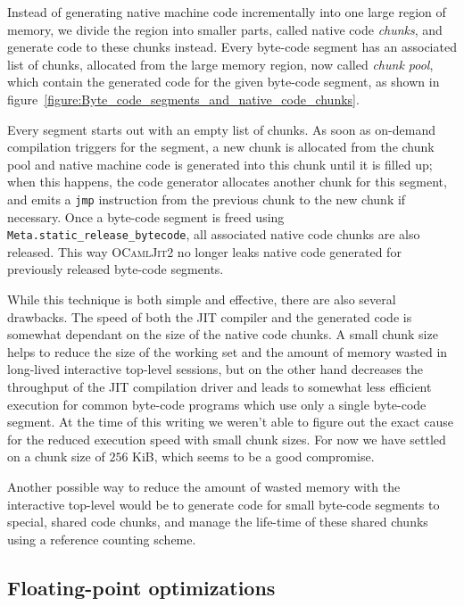 \documentclass[12pt,a4paper,final]{article}
\begin{document}
Instead of generating native machine code incrementally into one large region of
memory, we divide the region into smaller parts, called native code \emph{chunks},
and generate code to these chunks instead. Every byte-code segment has an associated list of
chunks, allocated from the large memory region, now called \emph{chunk pool},
which contain the generated code for the given byte-code segment, as shown
in figure~\ref{figure:Byte_code_segments_and_native_code_chunks}.

Every segment starts out with an empty list of chunks. As soon as on-demand compilation
triggers for the segment, a new chunk is allocated from the chunk pool and native
machine code is generated into this chunk until it is filled up; when this happens,
the code generator allocates another chunk for this segment, and emits a \texttt{jmp}
instruction from the previous chunk to the new chunk if necessary. Once a byte-code
segment is freed using \texttt{Meta.static\_release\_bytecode}, all associated native code
chunks are also released. This way \textsc{OCamlJit2} no longer leaks
native code generated for previously released byte-code segments.

While this technique is both simple and effective, there are also several drawbacks.
The speed of both the JIT compiler and the generated code is somewhat dependant
on the size of the native code chunks. A small chunk size helps to reduce the size of
the working set and the amount of memory wasted in long-lived interactive top-level
sessions, but on the other hand decreases the throughput of the JIT compilation
driver and leads to somewhat less efficient execution for common byte-code programs
which use only a single byte-code segment. At the time of this writing we weren't
able to figure out the exact cause for the reduced execution speed with small chunk
sizes. For now we have settled on a chunk size of $256$ KiB, which seems to be a
good compromise.

Another possible way to reduce the amount of wasted memory with the interactive
top-level would be to generate code for small byte-code segments to special,
shared code chunks, and manage the life-time of these shared chunks using a
reference counting scheme.

\subsection{Floating-point optimizations} \label{subsection:Floating_point_optimizations}
\end{document}
